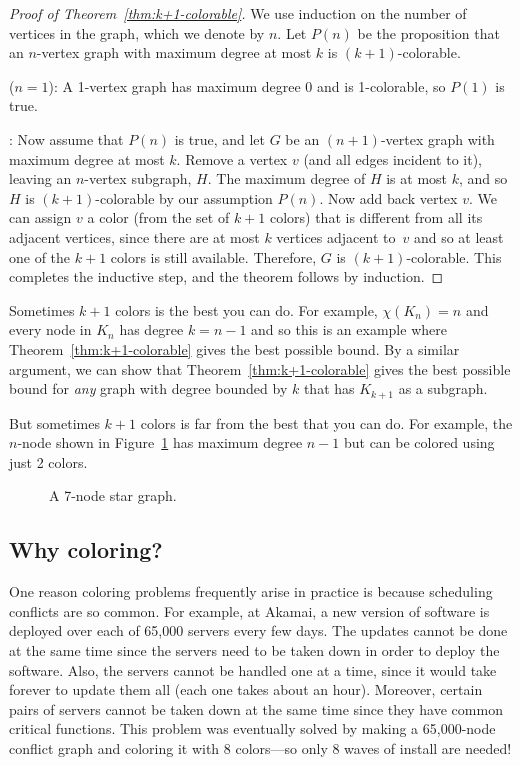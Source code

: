\begin{proof}[Proof of Theorem~\ref{thm:k+1-colorable}]
We use induction on the number of vertices in the graph, which we
denote by $n$.  Let $P(n)$ be the proposition that an $n$-vertex graph
with maximum degree at most $k$ is $(k+1)$-colorable.

 ($n=1$): A 1-vertex graph has maximum degree
0 and is 1-colorable, so $P(1)$ is true.

: Now assume that $P(n)$ is true, and
let $G$ be an $(n+1)$-vertex graph with maximum degree at most $k$.
Remove a vertex $v$ (and all edges incident to it), leaving an
$n$-vertex subgraph, $H$.  The maximum degree of $H$ is at most $k$,
and so $H$ is $(k+1)$-colorable by our assumption $P(n)$.  Now add
back vertex $v$.  We can assign $v$ a color (from the set of $k + 1$
colors) that is different from all its adjacent vertices, since there
are at most $k$ vertices adjacent to~$v$ and so at least one of the
$k+1$ colors is still available.  Therefore, $G$ is $(k+1)$-colorable.
This completes the inductive step, and the theorem follows by
induction.
\end{proof}

Sometimes $k+1$ colors is the best you can do.  For example, $\chi(K_n) = n$
and every node in $K_n$ has degree $k = n - 1$ and so this is an example where
Theorem~\ref{thm:k+1-colorable} gives the best possible bound.  By a
similar argument, we can show that Theorem~\ref{thm:k+1-colorable} gives
the best possible bound for \emph{any} graph with degree bounded by
$k$ that has $K_{k+1}$ as a subgraph.

But sometimes $k+1$ colors is far from the best that you can do.
For example, the $n$-node  shown in
Figure~\ref{fig:5T} has maximum degree $n - 1$ but can be colored
using just 2 colors.

\begin{figure}


\caption{A 7-node star graph.}

\label{fig:5T}

\end{figure}


\subsection{Why coloring?}

One reason coloring problems frequently arise in practice is because
scheduling conflicts are so common.  For example, at Akamai, a new
version of software is deployed over each of 65,000 servers every few
days.  The updates cannot be done at the same time since the servers
need to be taken down in order to deploy the software.  Also, the
servers cannot be handled one at a time, since it would take forever
to update them all (each one takes about an hour).  Moreover, certain
pairs of servers cannot be taken down at the same time since they have
common critical functions.  This problem was eventually solved by
making a 65,000-node conflict graph and coloring it with 8 colors---so
only 8 waves of install are needed!

